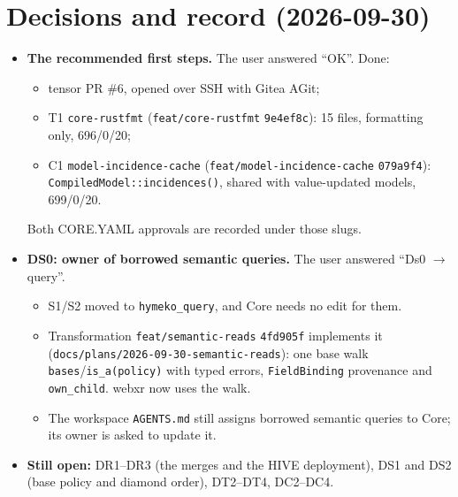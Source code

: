 \documentclass[11pt,a4paper]{article}
\newcommand{\code}[1]{\texttt{#1}}
\begin{document}
\section{Decisions and record (2026-09-30)}
\begin{itemize}[nosep]
\item \textbf{The recommended first steps.} The user answered ``OK''. Done:
  \begin{itemize}[nosep]
  \item tensor PR \#6, opened over SSH with Gitea AGit;
  \item T1 \code{core-rustfmt} (\code{feat/core-rustfmt} \code{9e4ef8c}): 15 files, formatting only, 696/0/20;
  \item C1 \code{model-incidence-cache} (\code{feat/model-incidence-cache} \code{079a9f4}):
    \code{CompiledModel::incidences()}, shared with value-updated models, 699/0/20.
  \end{itemize}
  Both CORE.YAML approvals are recorded under those slugs.
\item \textbf{DS0: owner of borrowed semantic queries.} The user answered ``Ds0 $\to$ query''.
  \begin{itemize}[nosep]
  \item S1/S2 moved to \code{hymeko\_query}, and Core needs no edit for them.
  \item Transformation \code{feat/semantic-reads} \code{4fd905f} implements it
    (\code{docs/plans/2026-09-30-semantic-reads}): one base walk \code{bases}/\code{is\_a(policy)} with
    typed errors, \code{FieldBinding} provenance and \code{own\_child}. webxr now uses the walk.
  \item The workspace \code{AGENTS.md} still assigns borrowed semantic queries to Core; its owner is
    asked to update it.
  \end{itemize}
\item \textbf{Still open:} DR1--DR3 (the merges and the HIVE deployment), DS1 and DS2 (base policy and
  diamond order), DT2--DT4, DC2--DC4.
\end{itemize}
\end{document}
